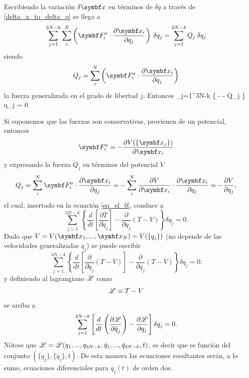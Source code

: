 \documentclass[10pt,oneside]{CBFT_book}
\begin{document}
Escribiendo la variación $\delta\vb{x}$ en términos de $\delta q$ a través de \eqref{delta_x_to_delta_q}
se llega a 
\[
	\sum_{j=1}^{3N-k} \sum_i^N \left( \vb{F}_i^a \cdot \dpar{\vb{x}_i}{q_j} \right) \: \delta q_j =  
	\sum_{j=1}^{3N-k} Q_j \: \delta q_j
\]
siendo 
\[
	Q_j = \sum_i^N \left( \vb{F}_i^a \cdot \dpar{\vb{x}_i}{q_j} \right)
\]
la fuerza generalizada en el grado de libertad $j$. Entonces
\be
	\sum_{j=1}^{3N-k} \left\{ 
	 -  - Q_j \right\} \delta q_j =  0
	\label{eq_el_0}
\ee

Si suponemos que las fuerzas son conservativas, provienen de un potencial, entonces 
\[
	\vb{F}_i^a = -\dpar{V(\{ \vb{x}_j \})}{\vb{x}_i}
\]
y expresando la fuerza $Q_j$ en términos del potencial $V$
\[
	Q_j = \sum_i^N \vb{F}_i^a \cdot \dpar{\vb{x}_i}{q_j} = 
	- \sum_i^N \dpar{V}{\vb{x}_i} \cdot \dpar{\vb{x}_i}{q_j} = -\dpar{V}{q_j},
\]
el cual, insertado en la ecuación \eqref{eq_el_0}, conduce a
\[
	\sum_{j=1}^{3N-k} \left\{ \frac{d}{dt}
	\left[ \frac{\partial T}{\partial \dot{q}_j} \right] - \frac{\partial}{\partial q_j} \left( T - V \right) \right\} \delta q_j =  0.
\]
Dado que $ V = V(\vb{x}_1,...,\vb{x}_N) = V( \{ q_j \} )$ (no depende de las velocidades generalizadas $ \dot{q}_j $) se puede escribir 
\[
	\sum_{j=1}^{3N-k} \left\{ \frac{d}{dt}
	\left[ \frac{\partial}{\partial \dot{q}_j} \left( T - V \right) \right] - 
	\frac{\partial}{\partial q_j} \left( T - V \right) \right\} \delta q_j =  0.
\]
y definiendo al lagrangiano $\mathscr{L}$ como 
\[
	\mathscr{L} \equiv T - V
\]
se arriba a
\[
	\sum_{j=1}^{3N-k} \left[
	\frac{d}{dt} \left( \frac{\partial^{\hspace{-0.05em}} {\mathscr{L}}}{\partial {\dot{q}_j}^{\hspace{-0.05em}}} \right) -  \frac{\partial^{\hspace{-0.05em}} {\mathscr{L}}}{\partial {q_j}^{\hspace{-0.05em}}} \right] \delta q_j =  0.
\]
Nótese que $\mathscr{L} = \mathscr{L}( q_1,...,q_{3N-k}, \dot{q}_1, ..., \dot{q}_{3N-k}, t ) $, es decir que es función 
del conjunto $(\{ q_j \}, \{ \dot{q}_j \}, t)$. De esta manera las ecuaciones resultantes serán, a lo sumo,
ecuaciones diferenciales para $q_j(t)$ de orden dos.
\end{document}
